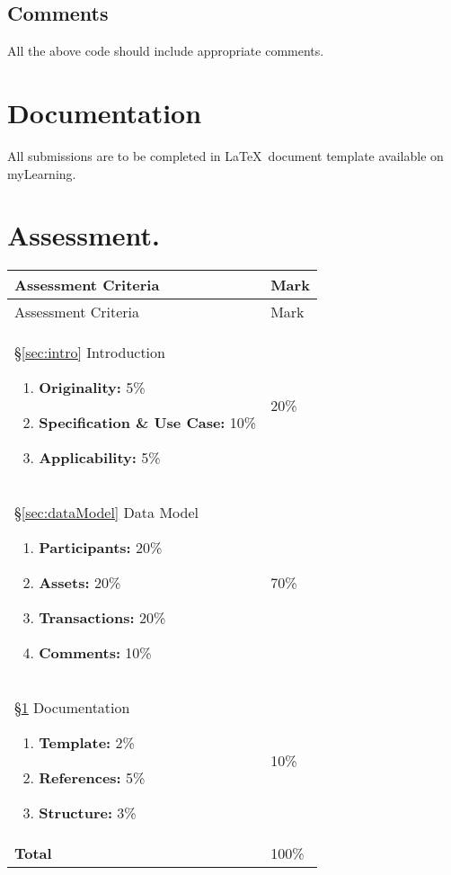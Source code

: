 \subsection{Comments}
All the above code should include appropriate comments.


\section{Documentation}\label{sec:doc}
All submissions are to be completed in \LaTeX\ document template available on myLearning. 


\section*{Assessment.}\label{sec:sa}
\setcounter{LTchunksize}{12}
\begin{longtable}{| p{120mm} | p{10mm} |}
\hline 
 Assessment Criteria & Mark\\ 
\hline \hline
\endfirsthead

\hline
 Assessment Criteria & Mark\\ 
\hline \hline
\endhead

\S\ref{sec:intro} Introduction
\begin{enumerate}
\item {\bf Originality:} 5\%
\item {\bf Specification \& Use Case:} 10\%
\item {\bf Applicability:} 5\%
\end{enumerate}
& 20\% \\ \hline

\S\ref{sec:dataModel} Data Model
\begin{enumerate}
\item {\bf Participants:} 20\%
\item {\bf Assets:} 20\%
\item {\bf Transactions:} 20\%
\item {\bf Comments:} 10\%
\end{enumerate}

& 70\% \\ \hline

\S\ref{sec:doc} Documentation
\begin{enumerate}
\item {\bf Template:} 2\%
\item {\bf References:} 5\%
\item {\bf Structure:} 3\%
\end{enumerate}
& 10\% \\ \hline \hline

{\bf Total} & 100\% \\ \hline

%



\end{longtable}
